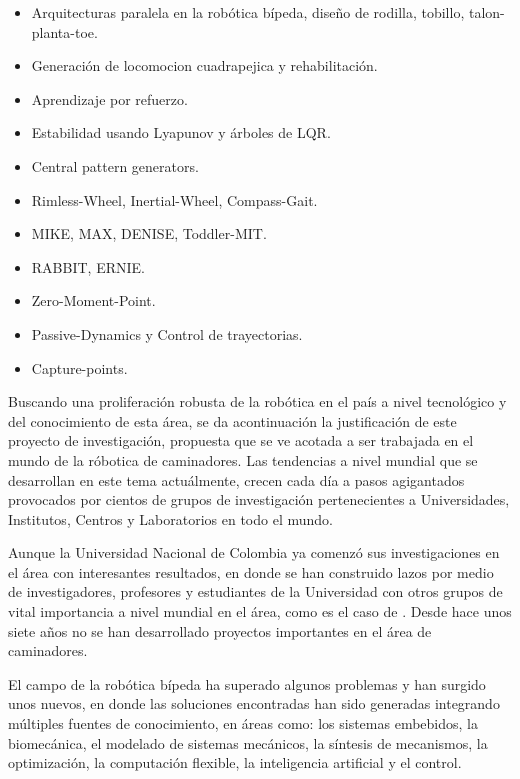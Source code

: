 {\begin{frame}
\begin{itemize}
  \item Arquitecturas paralela en la rob\'otica b\'ipeda, dise\~no de rodilla, tobillo, talon-planta-toe.
  \item Generaci\'on de locomocion cuadrapejica y rehabilitaci\'on.
  \item Aprendizaje por refuerzo.
  \item Estabilidad usando Lyapunov y \'arboles de LQR.
  \item Central pattern generators.
  \item Rimless-Wheel, Inertial-Wheel, Compass-Gait. 
  \item MIKE, MAX, DENISE, Toddler-MIT.
  \item RABBIT, ERNIE.
  \item Zero-Moment-Point.
  \item Passive-Dynamics y Control de trayectorias.
  \item Capture-points.
  \end{itemize}
\end{frame}
}
Buscando una proliferaci\'on robusta de la rob\'otica en el pa\'is a nivel tecnol\'ogico y del conocimiento de esta \'area, se da acontinuaci\'on la justificaci\'on de este proyecto de investigaci\'on, propuesta que se ve acotada a ser trabajada en el mundo de la r\'obotica de caminadores.  Las tendencias a nivel mundial que se desarrollan en este tema actu\'almente, crecen cada d\'ia a pasos agigantados provocados por cientos de grupos de investigaci\'on pertenecientes a Universidades, Institutos, Centros y Laboratorios en todo el mundo.\par
Aunque la Universidad Nacional de Colombia ya comenz\'o sus investigaciones en el \'area con interesantes resultados\cite{M2005,M2005a,Roa2006,Heredia2007}, en donde se han construido lazos por medio de investigadores, profesores y estudiantes de la Universidad con otros grupos de vital importancia a nivel mundial en el \'area, como es el caso de \cite{Englsberger2011,Ott2011,M2013}. Desde hace unos siete a\~nos no se han desarrollado proyectos importantes en el \'area de caminadores.\par
El campo de la rob\'otica b\'ipeda ha superado algunos problemas y han surgido unos nuevos, en donde las soluciones encontradas han sido generadas integrando m\'ultiples fuentes de conocimiento, en \'areas como: los sistemas embebidos\cite{Barker2010,Pan2010,Kimm2012,Wang2011,Amir2013}, la biomec\'anica\cite{Mahmoodi2013,Lim2014,Wu2013,Aoustin2013,Chiang2013,Xiang2010,Hobon2014}, el modelado de sistemas mec\'anicos\cite{Chiang2013}, la s\'intesis de mecanismos\cite{Li2008,Aoustin2013,Wu2013a,Xu2013,Hobon2014}, la optimizaci\'on\cite{Xiang2010,Lim2014,Kherici2014,Mahmoodabadi2014}, la computaci\'on flexible\cite{Wang2013,Kherici2014,Mahmoodabadi2014}, la inteligencia artificial\cite{Treesatayapun2014,Yuan2014,Wu2014,Wang2013} y el control\cite{Dou2013,Treesatayapun2014,Yuan2014,Wu2014}.\par

